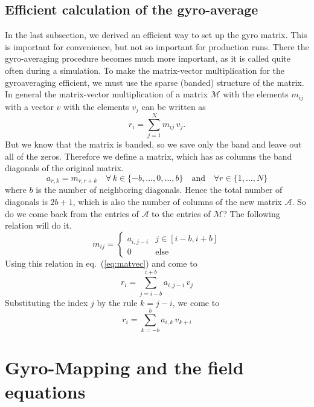 \subsection{Efficient calculation of the gyro-average}
In the last subsection, we derived an efficient way to set up the gyro
matrix. This is important for convenience, but not so important for
production runs. There the gyro-averaging procedure becomes much more
important, as it is called quite often during a simulation. To make
the matrix-vector multiplication for the gyroaveraging efficient, we
must use the sparse (banded) structure of the matrix. In general the
matrix-vector multiplication of a matrix $\mathcal{M}$ with the
elements $m_{ij}$ with a vector $v$ with the elements $v_j$ can be
written as
\begin{equation}
  \label{eq:matvec}
  r_i=\sum_{j=1}^N m_{ij}\,v_j.
\end{equation}
But we know that the matrix is banded, so we save only the band and
leave out all of the zeros. Therefore we define a matrix, which has as
columns the band diagonals of the original matrix. 
\begin{displaymath}
  a_{r,k}=m_{r,r+k}\quad\forall\,k\in\{-b,\ldots,0,\ldots,b\}\quad\mbox{and}\quad\forall r\in\{1,\ldots,N\}
\end{displaymath}
where $b$ is the number of neighboring diagonals. Hence the total
number of diagonals is $2b+1$, which is also the number of columns of
the new matrix $\mathcal{A}$. So do we come back from the entries of
$\mathcal{A}$ to the entries of $\mathcal{M}$? The following relation
will do it.
\begin{displaymath}
  m_{ij}=
  \begin{cases}
    a_{i,j-i} & j\in[i-b,i+b]\\
    0 & \mbox{else}
  \end{cases}
\end{displaymath}
Using this relation in eq.~(\ref{eq:matvec}) and come to
\begin{displaymath}
  r_i=\sum_{j=i-b}^{i+b} a_{i,j-i}\,v_j
\end{displaymath}
Substituting the index $j$ by the rule $k=j-i$, we come to
\begin{displaymath}
  r_i=\sum_{k=-b}^{b} a_{i,k}\,v_{k+i}
\end{displaymath}





\section{Gyro-Mapping and the field equations}
\label{sec:gyromapping}

